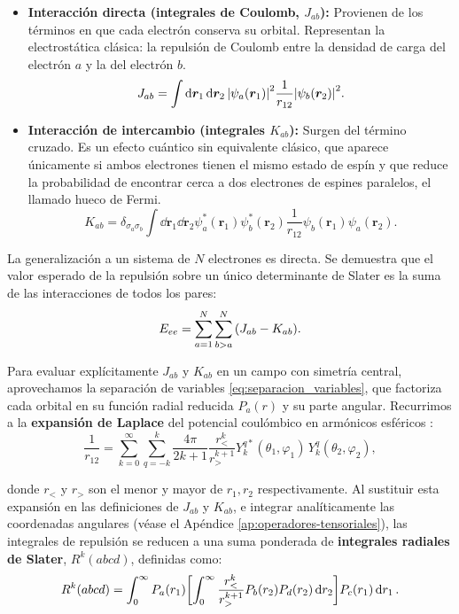 \begin{itemize}
\item \textbf{Interacción directa (integrales de Coulomb, \(J_{ab}\)):}
  Provienen de los términos en que cada electrón conserva su orbital. Representan la electrostática clásica: la repulsión de Coulomb entre la densidad de carga del electrón $a$ y la del electrón $b$.
  \begin{equation}
  J_{ab} = \int \dd{\bm{r}_1} \dd{\bm{r}_2} \abs{\psi_a(\bm{r}_1)}^2 \frac{1}{r_{12}} \abs{\psi_b(\bm{r}_2)}^2.
  \end{equation}

\item \textbf{Interacción de intercambio (integrales \(K_{ab}\)):}
  Surgen del término cruzado. Es un efecto cuántico sin equivalente clásico, que aparece únicamente si ambos electrones tienen el mismo estado de espín y que reduce la probabilidad de encontrar cerca a dos electrones de espines paralelos, el llamado hueco de Fermi.
  \begin{equation}
  K_{ab} = \delta_{\sigma_a \sigma_b} \int \dd{\bm{r}_1} \dd{\bm{r}_2} \psi_a^*(\bm{r}_1)\psi_b^*(\bm{r}_2)\frac{1}{r_{12}}\psi_b(\bm{r}_1)\psi_a(\bm{r}_2).
  \end{equation}
\end{itemize}

La generalización a un sistema de $N$ electrones es directa. Se demuestra \parencite{Cowan1981} que el valor esperado de la repulsión sobre un único determinante de Slater es la suma de las interacciones de todos los pares:
\begin{equation}
  E_{ee} = \sum_{a=1}^N \sum_{b>a}^N \qty( J_{ab} - K_{ab} ).
\end{equation}

Para evaluar explícitamente $J_{ab}$ y $K_{ab}$ en un campo con simetría central, aprovechamos la separación de variables \eqref{eq:separacion_variables}, que factoriza cada orbital en su función radial reducida $P_a(r)$ y su parte angular. Recurrimos a la \textbf{expansión de Laplace} del potencial coulómbico en armónicos esféricos \parencite[Sección 3.6]{Jackson1999}:
\begin{equation}
  \frac{1}{r_{12}} = \sum_{k=0}^{\infty} \sum_{q=-k}^{k} \frac{4\pi}{2k+1} \frac{r_<^{k}}{r_>^{k+1}} Y_k^{q*}(\theta_1, \varphi_1)\, Y_k^q(\theta_2, \varphi_2),
\end{equation}

donde $r_<$ y $r_>$ son el menor y mayor de $r_1, r_2$ respectivamente. Al sustituir esta expansión en las definiciones de $J_{ab}$ y $K_{ab}$, e integrar analíticamente las coordenadas angulares (véase el Apéndice \ref{ap:operadores-tensoriales}), las integrales de repulsión se reducen a una suma ponderada de \textbf{integrales radiales de Slater}, $R^k(abcd)$, definidas como:
\begin{equation}
  \label{eq:slater_k}
  R^k(abcd) = \int_0^\infty P_a(r_1) \qty[ \int_0^\infty \frac{r_{<}^k}{r_{>}^{k+1}} P_b(r_2) P_d(r_2) \dd{r_2} ] P_c(r_1) \dd{r_1}.
\end{equation}

